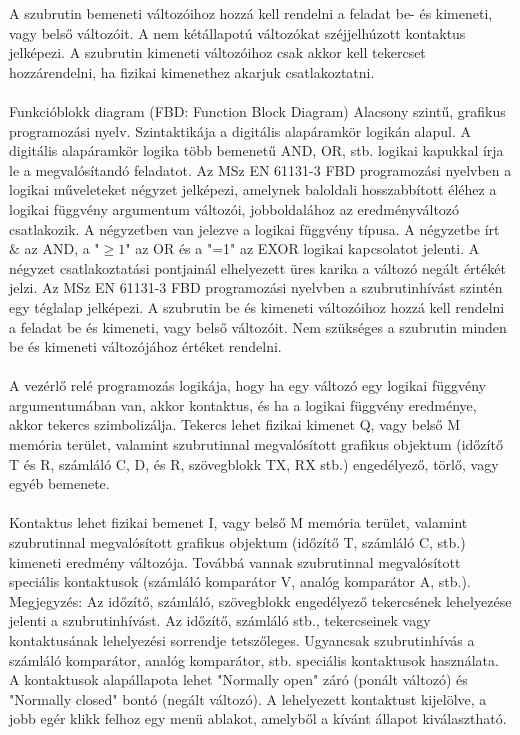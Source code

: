 \documentclass[11pt,a4paper]{article}
\begin{document}
A szubrutin bemeneti változóihoz hozzá kell
rendelni a feladat be- és kimeneti, vagy belső változóit.
A nem kétállapotú változókat széjjelhúzott kontaktus
jelképezi. A szubrutin kimeneti változóihoz
csak akkor kell tekercset hozzárendelni, ha
fizikai kimenethez akarjuk csatlakoztatni.\\\\
Funkcióblokk diagram (FBD: Function Block Diagram)
Alacsony szintű, grafikus programozási nyelv. Szintaktikája a digitális alapáramkör logikán alapul. A digitális alapáramkör logika több bemenetű
AND, OR, stb. logikai kapukkal írja le a megvalósítandó feladatot.
Az MSz EN 61131-3 FBD programozási
nyelvben a logikai műveleteket négyzet jelképezi,
amelynek baloldali hosszabbított éléhez a logikai
függvény argumentum változói, jobboldalához az eredményváltozó csatlakozik. A négyzetben van jelezve a logikai függvény típusa. A négyzetbe írt $\&$ az AND, a
"$\ge1$" az OR és a "=1" az EXOR logikai kapcsolatot
jelenti. A négyzet csatlakoztatási pontjainál elhelyezett
üres karika a változó negált értékét jelzi.
Az MSz EN 61131-3 FBD programozási
nyelvben a szubrutinhívást szintén egy téglalap jelképezi.
A szubrutin be és kimeneti változóihoz hozzá
kell rendelni a feladat be és kimeneti, vagy belső
változóit. Nem szükséges a szubrutin minden be és
kimeneti változójához értéket rendelni.
\\\\
A vezérlő relé programozás logikája,
hogy ha egy változó egy logikai
függvény argumentumában van, akkor
kontaktus, és ha a logikai függvény
eredménye, akkor tekercs szimbolizálja.
Tekercs lehet fizikai kimenet Q,
vagy belső M memória terület, valamint
szubrutinnal megvalósított grafikus objektum
(időzítő T és R, számláló C, D, és
R, szövegblokk TX, RX stb.) engedélyező,
törlő, vagy egyéb bemenete.
\\\\
Kontaktus lehet fizikai bemenet I, vagy belső M memória terület, valamint
szubrutinnal megvalósított grafikus objektum (időzítő T, számláló C, stb.)
kimeneti eredmény változója. Továbbá vannak szubrutinnal megvalósított speciális
kontaktusok (számláló komparátor V, analóg komparátor A, stb.).
Megjegyzés: Az időzítő, számláló, szövegblokk engedélyező tekercsének
lehelyezése jelenti a szubrutinhívást. Az időzítő, számláló stb., tekercseinek
vagy kontaktusának lehelyezési sorrendje tetszőleges. Ugyancsak szubrutinhívás
a számláló komparátor, analóg komparátor, stb. speciális kontaktusok
használata.
A kontaktusok alapállapota lehet "Normally open" záró (ponált változó)
és "Normally closed" bontó (negált változó). A lehelyezett kontaktust kijelölve,
a jobb egér klikk felhoz egy menü ablakot, amelyből a kívánt állapot kiválasztható.
\end{document}
